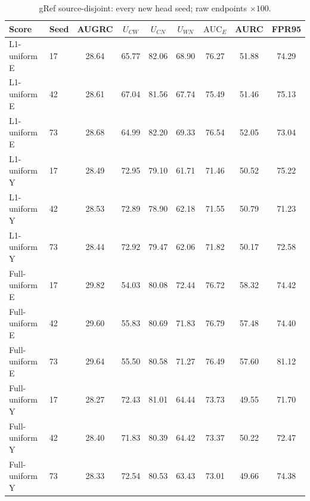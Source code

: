 \begin{table}[t]
\centering\footnotesize
\setlength{\tabcolsep}{3pt}
\renewcommand{\arraystretch}{1.15}
\caption{gRef source-disjoint: every new head seed; raw endpoints $\times100$.}\label{tab:coverage_seeds_gref_source_disjoint}
\begin{tabular}{@{}llccccccc@{}}\toprule
Score & Seed & AUGRC & $U_{CW}$ & $U_{CN}$ & $U_{WN}$ & $\mathrm{AUC}_E$ & AURC & FPR95\\\midrule
L1-uniform E & 17 & 28.64 & 65.77 & 82.06 & 68.90 & 76.27 & 51.88 & 74.29\\
L1-uniform E & 42 & 28.61 & 67.04 & 81.56 & 67.74 & 75.49 & 51.46 & 75.13\\
L1-uniform E & 73 & 28.68 & 64.99 & 82.20 & 69.33 & 76.54 & 52.05 & 73.04\\
L1-uniform Y & 17 & 28.49 & 72.95 & 79.10 & 61.71 & 71.46 & 50.52 & 75.22\\
L1-uniform Y & 42 & 28.53 & 72.89 & 78.90 & 62.18 & 71.55 & 50.79 & 71.23\\
L1-uniform Y & 73 & 28.44 & 72.92 & 79.47 & 62.06 & 71.82 & 50.17 & 72.58\\
Full-uniform E & 17 & 29.82 & 54.03 & 80.08 & 72.44 & 76.72 & 58.32 & 74.42\\
Full-uniform E & 42 & 29.60 & 55.83 & 80.69 & 71.83 & 76.79 & 57.48 & 74.40\\
Full-uniform E & 73 & 29.64 & 55.50 & 80.58 & 71.27 & 76.49 & 57.60 & 81.12\\
Full-uniform Y & 17 & 28.27 & 72.43 & 81.01 & 64.44 & 73.73 & 49.55 & 71.70\\
Full-uniform Y & 42 & 28.40 & 71.83 & 80.39 & 64.42 & 73.37 & 50.22 & 72.47\\
Full-uniform Y & 73 & 28.33 & 72.54 & 80.53 & 63.43 & 73.01 & 49.66 & 74.38\\
\bottomrule\end{tabular}
\end{table}
